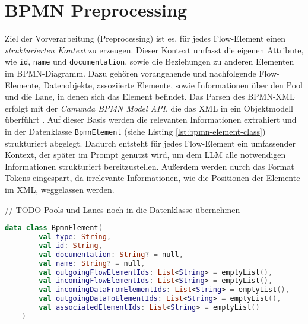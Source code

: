 \section{BPMN Preprocessing}\label{sec:bpmn-preprocessing}

Ziel der Vorverarbeitung (Preprocessing) ist es, für jedes Flow-Element einen \emph{strukturierten Kontext} zu erzeugen. Dieser Kontext umfasst die eigenen Attribute, wie \texttt{id}, \texttt{name} und \texttt{documentation}, sowie die Beziehungen zu anderen Elementen im BPMN-Diagramm. Dazu gehören vorangehende und nachfolgende Flow-Elemente, Datenobjekte, assoziierte Elemente, sowie Informationen über den Pool und die Lane, in denen sich das Element befindet. Das Parsen des \ac{BPMN}-XML erfolgt mit der \emph{Camunda BPMN Model API}, die das XML in ein Objektmodell überführt \cite{camunda-bpmn-model-api, camunda-bpmn-model-read}. Auf dieser Basis werden die relevanten Informationen extrahiert und in der Datenklasse \texttt{BpmnElement} (siehe Listing \ref{lst:bpmn-element-class}) strukturiert abgelegt. Dadurch entsteht für jedes Flow-Element ein umfassender Kontext, der später im Prompt genutzt wird, um dem \ac{LLM} alle notwendigen Informationen strukturiert bereitzustellen. Außerdem werden durch das Format Tokens eingespart, da irrelevante Informationen, wie die Positionen der Elemente im XML, weggelassen werden.

// TODO Pools und Lanes noch in die Datenklasse übernehmen

\begin{lstlisting}[language=Kotlin,caption={Interne \ac{BPMN}-Repräsentation je Flow-Element.},label={lst:bpmn-element-class}]
    data class BpmnElement(
        val type: String,
        val id: String,
        val documentation: String? = null,
        val name: String? = null,
        val outgoingFlowElementIds: List<String> = emptyList(),
        val incomingFlowElementIds: List<String> = emptyList(),
        val incomingDataFromElementIds: List<String> = emptyList(),
        val outgoingDataToElementIds: List<String> = emptyList(),
        val associatedElementIds: List<String> = emptyList()
    )
\end{lstlisting}